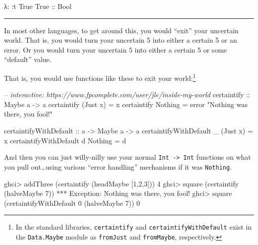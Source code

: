 \documentclass[]{article}
\newenvironment{Shaded}{}{}
\newcommand{\DataTypeTok}[1]{\textcolor[rgb]{0.56,0.13,0.00}{{#1}}}
\newcommand{\DecValTok}[1]{\textcolor[rgb]{0.25,0.63,0.44}{{#1}}}
\newcommand{\StringTok}[1]{\textcolor[rgb]{0.25,0.44,0.63}{{#1}}}
\newcommand{\CommentTok}[1]{\textcolor[rgb]{0.38,0.63,0.69}{\textit{{#1}}}}
\newcommand{\OtherTok}[1]{\textcolor[rgb]{0.00,0.44,0.13}{{#1}}}
\newcommand{\FunctionTok}[1]{\textcolor[rgb]{0.02,0.16,0.49}{{#1}}}
\newcommand{\NormalTok}[1]{{#1}}
\begin{document}
\begin{Shaded}
\begin{Highlighting}[]
\NormalTok{λ}\FunctionTok{:} \FunctionTok{:}\NormalTok{t }\DataTypeTok{True}
\DataTypeTok{True}\OtherTok{ ::} \DataTypeTok{Bool}
\end{Highlighting}
\end{Shaded}

\begin{center}\rule{0.5\linewidth}{\linethickness}\end{center}

In most other languages, to get around this, you would ``exit'' your
uncertain world. That is, you would turn your uncertain 5 into either a
certain 5 or an error. Or you would turn your uncertain 5 into either a
certain 5 or some ``default'' value.

That is, you would use functions like these to exit your
world:\footnote{In the standard libraries, \texttt{certaintify} and
  \texttt{certaintifyWithDefault} exist in the \texttt{Data.Maybe}
  module as \texttt{fromJust} and \texttt{fromMaybe}, respectively.}

\begin{Shaded}
\begin{Highlighting}[]
\CommentTok{-- interactive: https://www.fpcomplete.com/user/jle/inside-my-world}
\OtherTok{certaintify ::} \DataTypeTok{Maybe} \NormalTok{a }\OtherTok{->} \NormalTok{a}
\NormalTok{certaintify (}\DataTypeTok{Just} \NormalTok{x) }\FunctionTok{=} \NormalTok{x}
\NormalTok{certaintify }\DataTypeTok{Nothing}  \FunctionTok{=} \NormalTok{error }\StringTok{"Nothing was there, you fool!"}

\OtherTok{certaintifyWithDefault ::} \NormalTok{a }\OtherTok{->} \DataTypeTok{Maybe} \NormalTok{a }\OtherTok{->} \NormalTok{a}
\NormalTok{certaintifyWithDefault _ (}\DataTypeTok{Just} \NormalTok{x) }\FunctionTok{=} \NormalTok{x}
\NormalTok{certaintifyWithDefault d }\DataTypeTok{Nothing}  \FunctionTok{=} \NormalTok{d}
\end{Highlighting}
\end{Shaded}

And then you can just willy-nilly use your normal
\texttt{Int\ -\textgreater{}\ Int} functions on what you pull
out\ldots{}using various ``error handling'' mechanisms if it was
\texttt{Nothing}.

\begin{Shaded}
\begin{Highlighting}[]
\NormalTok{ghci}\FunctionTok{>} \NormalTok{addThree (certaintify (headMaybe [}\DecValTok{1}\NormalTok{,}\DecValTok{2}\NormalTok{,}\DecValTok{3}\NormalTok{]))}
\DecValTok{4}
\NormalTok{ghci}\FunctionTok{>} \NormalTok{square (certaintify (halveMaybe }\DecValTok{7}\NormalTok{))}
\FunctionTok{***} \DataTypeTok{Exception}\FunctionTok{:} \DataTypeTok{Nothing} \NormalTok{was there, you fool}\FunctionTok{!}
\NormalTok{ghci}\FunctionTok{>} \NormalTok{square (certaintifyWithDefault }\DecValTok{0} \NormalTok{(halveMaybe }\DecValTok{7}\NormalTok{))}
\DecValTok{0}
\end{Highlighting}
\end{Shaded}
\end{document}
